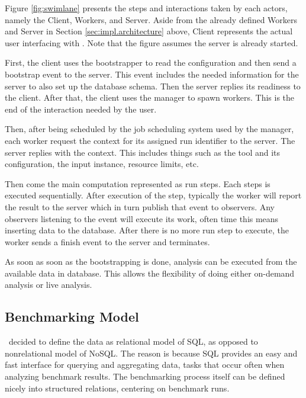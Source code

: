 Figure \ref{fig:swimlane} presents the steps and interactions taken by each actors, namely the Client, Workers, and Server.
Aside from the already defined Workers and Server in Section \ref{sec:impl.architecture} above, Client represents the actual user interfacing with \OurBenchmarkingTool.
Note that the figure assumes the server is already started.

First, the client uses the bootstrapper to read the configuration and then send a bootstrap event to the server.
This event includes the needed information for the server to also set up the database schema.
Then the server replies its readiness to the client.
After that, the client uses the manager to spawn workers.
This is the end of the interaction needed by the user.

Then, after being scheduled by the job scheduling system used by the manager, each worker request the context for its assigned run identifier to the server.
The server replies with the context.
This includes things such as the tool and its configuration, the input instance, resource limits, etc.

Then come the main computation represented as run steps.
Each steps is executed sequentially.
After execution of the step, typically the worker will report the result to the server which in turn publish that event to observers.
Any observers listening to the event will execute its work, often time this means inserting data to the database. After there is no more run step to execute, the worker sends a finish event to the server and terminates.

As soon as soon as the bootstrapping is done, analysis can be executed from the available data in database.
This allows the flexibility of doing either on-demand analysis or live analysis.


\subsection{Benchmarking Model}

\First~decided to define the data as relational model of SQL, as opposed to nonrelational model of NoSQL.
The reason is because SQL provides an easy and fast interface for querying and aggregating data, tasks that occur often when analyzing benchmark results.
The benchmarking process itself can be defined nicely into structured relations, centering on benchmark runs.

